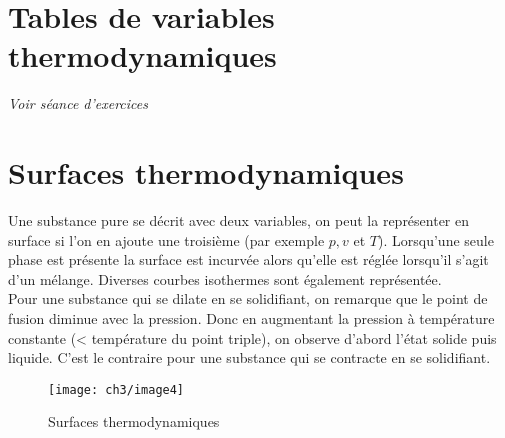 \section{Tables de variables thermodynamiques}
\textit{Voir séance d'exercices}


\section{Surfaces thermodynamiques}
Une substance pure se décrit avec deux variables, on peut la 
représenter en surface si l'on en ajoute une troisième (par 
exemple $p,v$ et $T$). Lorsqu'une seule phase est présente la 
surface est incurvée alors qu'elle est réglée lorsqu'il s'agit 
d'un mélange. Diverses courbes isothermes sont également 
représentée. \\
Pour une substance qui se dilate en se solidifiant, on remarque que le point de fusion diminue avec la pression. Donc en augmentant la pression à température constante (< température du point triple), on observe d'abord l'état solide puis liquide. C'est le contraire pour une substance qui se contracte en se solidifiant. 

\begin{figure}[H]
	\centering
	\texttt{[image: ch3/image4]}
	\caption{Surfaces thermodynamiques}
\end{figure}








 



